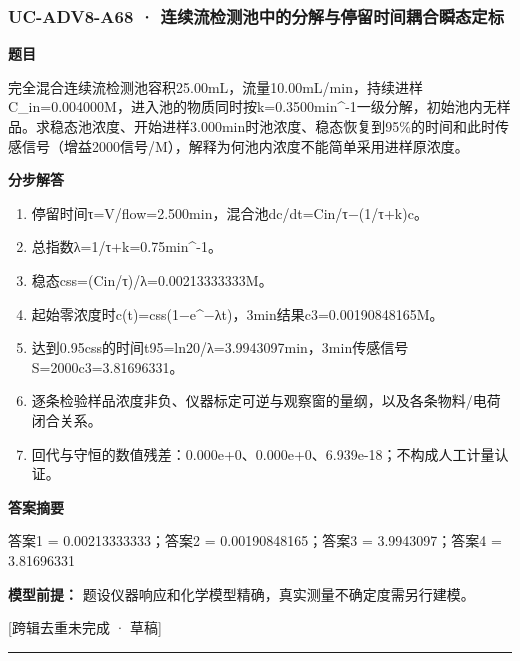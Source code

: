 \documentclass[UTF8,11pt,a4paper]{ctexart}
\begin{document}
\subsubsection*{UC-ADV8-A68 · 连续流检测池中的分解与停留时间耦合瞬态定标}
\noindent\textbf{题目}\par
完全混合连续流检测池容积25.00mL，流量10.00mL/min，持续进样C\_in=0.004000M，进入池的物质同时按k=0.3500min\textasciicircum{}-1一级分解，初始池内无样品。求稳态池浓度、开始进样3.000min时池浓度、稳态恢复到95\%的时间和此时传感信号（增益2000信号/M），解释为何池内浓度不能简单采用进样原浓度。\par
\medskip\noindent\textbf{分步解答}
\begin{enumerate}
\item 停留时间τ=V/flow=2.500min，混合池dc/dt=Cin/τ−(1/τ+k)c。
\item 总指数λ=1/τ+k=0.75min\textasciicircum{}-1。
\item 稳态css=(Cin/τ)/λ=0.00213333333M。
\item 起始零浓度时c(t)=css(1−e\textasciicircum{}−λt)，3min结果c3=0.00190848165M。
\item 达到0.95css的时间t95=ln20/λ=3.9943097min，3min传感信号S=2000c3=3.81696331。
\item 逐条检验样品浓度非负、仪器标定可逆与观察窗的量纲，以及各条物料/电荷闭合关系。
\item 回代与守恒的数值残差：0.000e+0、0.000e+0、6.939e-18；不构成人工计量认证。
\end{enumerate}
\noindent\textbf{答案摘要}\par
答案1 = 0.00213333333；答案2 = 0.00190848165；答案3 = 3.9943097；答案4 = 3.81696331\par
\noindent\textbf{模型前提：}
题设仪器响应和化学模型精确，真实测量不确定度需另行建模。\par
\noindent\textcolor{red!65!black}{[跨辑去重未完成 · 草稿]} \par
\medskip\hrule\medskip
{}
\end{document}
